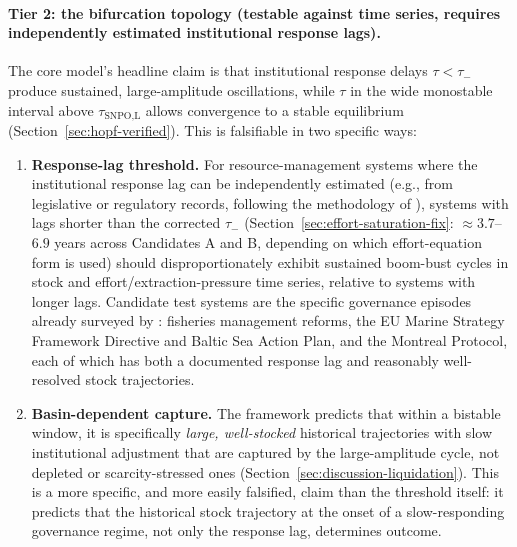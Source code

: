 \documentclass[twocolumn,10pt]{article}
\begin{document}
\paragraph{Tier 2: the bifurcation topology (testable against time series, requires independently estimated institutional response lags).} The core model's headline claim is that institutional response delays $\tau<\tau_-$ produce sustained, large-amplitude oscillations, while $\tau$ in the wide monostable interval above $\tau_{\text{SNPO,L}}$ allows convergence to a stable equilibrium (Section~\ref{sec:hopf-verified}). This is falsifiable in two specific ways:
\begin{enumerate}
\item \textbf{Response-lag threshold.} For resource-management systems where the institutional response lag can be independently estimated (e.g., from legislative or regulatory records, following the methodology of \cite{hocherman2025}), systems with lags shorter than the corrected $\tau_-$ (Section~\ref{sec:effort-saturation-fix}: $\approx3.7$--$6.9$ years across Candidates A and B, depending on which effort-equation form is used) should disproportionately exhibit sustained boom-bust cycles in stock and effort/extraction-pressure time series, relative to systems with longer lags. Candidate test systems are the specific governance episodes already surveyed by \cite{hocherman2025}: fisheries management reforms, the EU Marine Strategy Framework Directive and Baltic Sea Action Plan, and the Montreal Protocol, each of which has both a documented response lag and reasonably well-resolved stock trajectories.
\item \textbf{Basin-dependent capture.} The framework predicts that within a bistable window, it is specifically \emph{large, well-stocked} historical trajectories with slow institutional adjustment that are captured by the large-amplitude cycle, not depleted or scarcity-stressed ones (Section~\ref{sec:discussion-liquidation}). This is a more specific, and more easily falsified, claim than the threshold itself: it predicts that the historical stock trajectory at the onset of a slow-responding governance regime, not only the response lag, determines outcome.
\end{enumerate}
\end{document}
